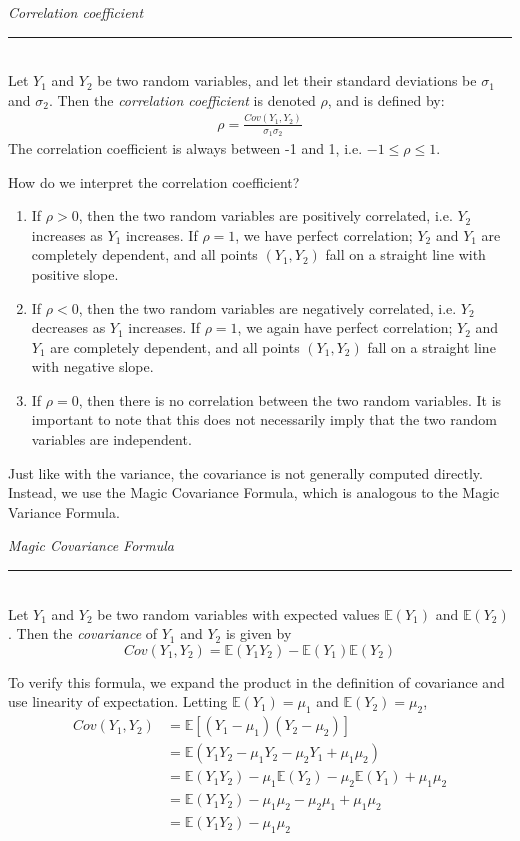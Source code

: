\documentclass[12pt]{article}
\theoremstyle{definition}
\theoremstyle{remark}
\def\E{{\mathbb E}}
\begin{document}
\begin{framed}
\emph{Correlation coefficient}\\
  \rule{\dimexpr{}\fboxrule}{.1pt} \\
Let $Y_1$ and $Y_2$ be two random variables, and let their standard deviations be $\sigma_1$ and $\sigma_2$. Then the \emph{correlation coefficient} is denoted $\rho$, and is defined by:
\begin{align*}
\rho = \frac{Cov(Y_1, Y_2) }{\sigma_1 \sigma_2}
\end{align*}
The correlation coefficient is always between -1 and 1, i.e. $-1 \leq \rho \leq 1$.
\end{framed}
How do we interpret the correlation coefficient?
\begin{enumerate}
\item If $\rho > 0$, then the two random variables are positively correlated, i.e. $Y_2$ increases as $Y_1$ increases. If $\rho = 1$, we have perfect correlation; $Y_2$ and $Y_1$ are completely dependent, and all points $(Y_1, Y_2)$ fall on a straight line with positive slope.
\item If $\rho < 0$, then the two random variables are negatively correlated, i.e. $Y_2$ decreases as $Y_1$ increases. If $\rho = 1$, we again have perfect correlation; $Y_2$ and $Y_1$ are completely dependent, and all points $(Y_1, Y_2)$ fall on a straight line with negative slope.
\item If $\rho = 0$, then there is no correlation between the two random variables. It is important to note that this does not necessarily imply that the two random variables are independent.
\end{enumerate}

Just like with the variance, the covariance is not generally computed directly. Instead, we use the Magic Covariance Formula, which is analogous to the Magic Variance Formula.

\begin{framed}
  \emph{Magic Covariance Formula}\\
  \rule{\dimexpr{}\fboxrule}{.1pt} \\
Let $Y_1$ and $Y_2$ be two random variables with expected values $\E(Y_1)$ and $\E(Y_2)$. Then the \emph{covariance} of $Y_1$ and $Y_2$ is given by
\[
Cov(Y_1, Y_2) = \E(Y_1 Y_2) - \E(Y_1) \E(Y_2)
\]
\end{framed}
To verify this formula, we expand the product in the definition of covariance and use linearity of expectation. Letting $\E(Y_1) = \mu_1$ and $\E(Y_2) = \mu_2$,
\begin{align*}
Cov(Y_1, Y_2) &= \E[ (Y_1 - \mu_1)(Y_2 - \mu_2)]\\
&= \E(Y_1 Y_2 - \mu_1 Y_2 - \mu_2 Y_1 + \mu_1 \mu_2) \\
&= \E(Y_1 Y_2) - \mu_1 \E(Y_2) - \mu_2 \E(Y_1) + \mu_1 \mu_2 \\
&= \E(Y_1 Y_2) - \mu_1 \mu_2 - \mu_2 \mu_1 + \mu_1 \mu_2 \\
&= \E(Y_1 Y_2) - \mu_1 \mu_2 
\end{align*}
\end{document}
